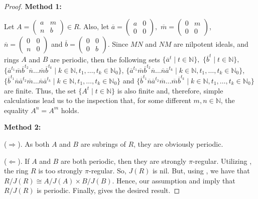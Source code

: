 \documentclass[12pt]{amsart}
\theoremstyle{definition}
\theoremstyle{remark}
\numberwithin{equation}{section}
\begin{document}
\begin{proof} \textbf{Method 1:}

Let $A=
  \left(
  \begin{array}{cc}
  a & m\\
  n & b
  \end{array}
  \right) \in R$.
Also, let $
  \overline{a}=
  \left(
  \begin{array}{cc}
  a & 0\\
  0 & 0
  \end{array}
  \right),
$ $
  \overline{m}=
  \left(
  \begin{array}{cc}
  0 & m\\
  0 & 0
  \end{array}
  \right)
$,
$
  \overline{n}=
  \left(
  \begin{array}{cc}
  0 & 0\\
  n & 0
  \end{array}
  \right)
$
and
$
   \overline{b}=
  \left(
  \begin{array}{cc}
  0 & 0\\
  0 & b
  \end{array}
  \right).
$
Since $MN$ and $NM$ are nilpotent ideals, and rings
$A$ and $B$ are periodic, then the following sets $\{\overline{a}^{t} \mid t\in\mathbb{N} \},$ $\{\overline{b}^{t} \mid t\in\mathbb{N} \},$
$\{\overline{a}^{t_1}\overline{m}\overline{b}^{t_2}\overline{n}\ldots \overline{m}\overline{b}^{t_k}          \mid k\in\mathbb{N}, t_1,\ldots, t_k\in \mathbb{N}_0 \}$,
$\{\overline{a}^{t_1}\overline{m}\overline{b}^{t_2}\overline{n}\ldots \overline{n}\overline{a}^{t_k}          \mid k\in\mathbb{N}, t_1,\ldots, t_k\in \mathbb{N}_0 \}$,
$\{\overline{b}^{t_1}\overline{n}\overline{a}^{t_2}\overline{m}\ldots \overline{n}\overline{a}^{t_k}          \mid k\in\mathbb{N}, t_1,\ldots, t_k\in \mathbb{N}_0 \}$ and $\{  \overline{b}^{t_1}\overline{n}\overline{a}^{t_2}\overline{m}\ldots \overline{m}\overline{b}^{t_k}          \mid k\in\mathbb{N}, t_1,\ldots, t_k\in \mathbb{N}_0 \}$ are finite.
Thus, the set $\{A^{t} \mid t\in\mathbb{N} \}$ is also finite and, therefore, simple calculations lead us to the inspection that, for some different $m,n \in \mathbb{N}$, the equality $A^n=A^m$ holds.

\textbf{Method 2:}

($\Rightarrow$). As both $A$ and $B$ are subrings of $R$, they are obviously periodic.

($\Leftarrow$). If $A$ and $B$ are both periodic, then they are strongly $\pi$-regular. Utilizing \cite[Theorem 3.5]{TLZ}, the ring $R$ is too strongly $\pi$-regular. So, $J(R)$ is nil. But, using \cite[Lemma 3.1]{TLZ}, we have that $R/J(R) \cong A/J(A) \times B/J(B)$. Hence, our assumption and \cite[Lemma 2.12]{BCL} imply that $R/J(R)$ is periodic. Finally, \cite[Proposition 2.4]{BCL} gives the desired result.
\end{proof}
\end{document}
